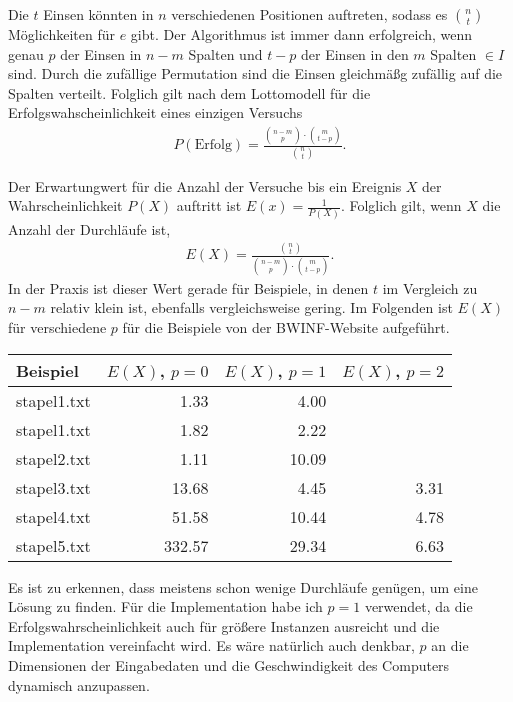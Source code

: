 \documentclass[a4paper,10pt,ngerman]{scrartcl}
\begin{document}
Die $t$ Einsen könnten in $n$ verschiedenen Positionen auftreten, sodass es $\binom{n}{t}$ Möglichkeiten für $e$ gibt. Der Algorithmus ist immer dann erfolgreich, wenn genau $p$ der Einsen in $n-m$ Spalten und $t-p$ der Einsen in den $m$ Spalten $\in I$ sind. Durch die zufällige Permutation sind die Einsen gleichmäßg zufällig auf die Spalten verteilt. Folglich gilt nach dem Lottomodell für die Erfolgswahscheinlichkeit eines einzigen Versuchs
\begin{align*}
    P(\text{Erfolg}) = \frac{\binom{n-m}{p} \cdot \binom{m}{t-p}}{\binom{n}{t}}.
\end{align*}

Der Erwartungwert für die Anzahl der Versuche bis ein Ereignis $X$ der Wahrscheinlichkeit $P(X)$ auftritt ist $E(x) = \frac{1}{P(X)}$.
Folglich gilt, wenn $X$ die Anzahl der Durchläufe ist,
\begin{align*}
    E(X) = \frac{\binom{n}{t}}{\binom{n-m}{p} \cdot \binom{m}{t-p}}.
\end{align*} 
In der Praxis ist dieser Wert gerade für Beispiele, in denen $t$ im Vergleich zu $n-m$ relativ klein ist, ebenfalls vergleichsweise gering. 
Im Folgenden ist $E(X)$ für verschiedene $p$ für die Beispiele von der BWINF-Website aufgeführt.
\begin{table}[H]
    \centering
    \begin{tabular}{lrrr}
        \toprule
    
        Beispiel & $E(X)$, $p=0$ & $E(X)$, $p=1$ & $E(X)$, $p=2$ \\\midrule
        stapel1.txt &1.33	&4.00 &  \\
        stapel1.txt &1.82&	2.22&  \\
        stapel2.txt &1.11	&10.09&  \\
    stapel3.txt &13.68&	4.45&	3.31 \\
    stapel4.txt	&51.58&	10.44 &4.78 \\
    stapel5.txt	&332.57	&29.34&	6.63\\\bottomrule
    \end{tabular}
\end{table}
Es ist zu erkennen, dass meistens schon wenige Durchläufe genügen, um eine Lösung zu finden. 
Für die Implementation habe ich $p=1$ verwendet, da die Erfolgswahrscheinlichkeit auch für größere Instanzen ausreicht und die Implementation vereinfacht wird. Es wäre natürlich auch denkbar, $p$ an die Dimensionen der Eingabedaten und die Geschwindigkeit des Computers dynamisch anzupassen.
\end{document}
